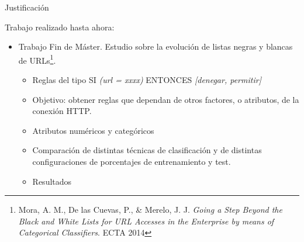 \documentclass{beamer}
\begin{document}
\begin{frame}{Justificación}

Trabajo realizado hasta ahora:

\begin{itemize}
  \item Trabajo Fin de Máster. Estudio sobre la evolución de listas negras y blancas de URLs\footnote{Mora, A. M., De las Cuevas, P., \& Merelo, J. J. \textit{Going a Step Beyond the Black and White Lists for URL Accesses in the Enterprise by means of Categorical Classifiers}. ECTA 2014}.
  \begin{itemize}
    \item Reglas del tipo SI \textit{(url = xxxx)} ENTONCES \textit{[denegar, permitir]}
    \item Objetivo: obtener reglas que dependan de otros factores, o atributos, de la conexión HTTP.
    \item Atributos numéricos y categóricos
    \item Comparación de distintas técnicas de clasificación y de distintas configuraciones de porcentajes de entrenamiento y test.
    \item Resultados
  \end{itemize}
\end{itemize}

\end{frame}
\end{document}
